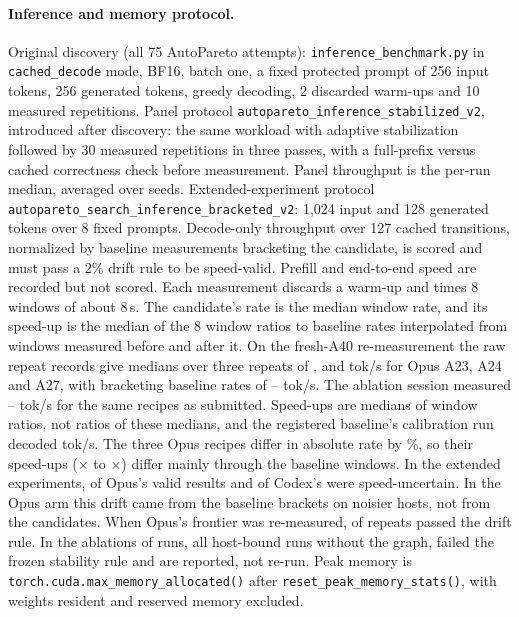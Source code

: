 \documentclass{article}
\begin{document}
\begin{table}[H]
\caption{Recorded software environment by era. Panel, Pair-A (extended experiments), E1 and Opus-test rows are read from their run records. Other rows are from the provenance audit.}\label{tab:env}
\centering\scriptsize
\end{table}

\paragraph{Inference and memory protocol.} Original discovery (all 75 AutoPareto attempts): \texttt{inference\_benchmark.py} in \texttt{cached\_decode} mode, BF16, batch one, a fixed protected prompt of 256 input tokens, 256 generated tokens, greedy decoding, 2 discarded warm-ups and 10 measured repetitions. Panel protocol \texttt{autopareto\_inference\_stabilized\_v2}, introduced after discovery: the same workload with adaptive stabilization followed by 30 measured repetitions in three passes, with a full-prefix versus cached correctness check before measurement. Panel throughput is the per-run median, averaged over seeds. Extended-experiment protocol \texttt{autopareto\_search\_inference\_bracketed\_v2}: 1,024 input and 128 generated tokens over 8 fixed prompts. Decode-only throughput over 127 cached transitions, normalized by baseline measurements bracketing the candidate, is scored and must pass a 2\% drift rule to be speed-valid. Prefill and end-to-end speed are recorded but not scored. Each measurement discards a warm-up and times 8 windows of about 8\,s. The candidate's rate is the median window rate, and its speed-up is the median of the 8 window ratios to baseline rates interpolated from windows measured before and after it. On the fresh-A40 re-measurement the raw repeat records give medians over three repeats of \CROpAbsTwentyThree, \CROpAbsTwentyFour{} and \CROpAbsTwentySeven{} tok/s for Opus A23, A24 and A27, with bracketing baseline rates of \CRPTwoBaseLo--\CRPTwoBaseHi{} tok/s. The ablation session measured \CRIAAbsLo--\CRIAAbsHi{} tok/s for the same recipes as submitted. Speed-ups are medians of window ratios, not ratios of these medians, and the registered baseline's calibration run decoded \CRAgBaseDecode{} tok/s. The three Opus recipes differ in absolute rate by \CROpAbsSpreadPct\%, so their speed-ups (\CROpDecodeLo$\times$ to \CROpDecodeHi$\times$) differ mainly through the baseline windows. In the extended experiments, \CROpUncertain{} of Opus's \CROpValid{} valid results and \CRCxUncertain{} of Codex's \CRCxValid{} were speed-uncertain. In the Opus arm this drift came from the baseline brackets on noisier hosts, not from the candidates. When Opus's frontier was re-measured, \CROpStableRepeats{} of \CROpRepeats{} repeats passed the drift rule. In the ablations \CRIAUnstable{} of \CRIARuns{} runs, all host-bound runs without the graph, failed the frozen stability rule and are reported, not re-run. Peak memory is \texttt{torch.cuda.max\_memory\_allocated()} after \texttt{reset\_peak\_memory\_stats()}, with weights resident and reserved memory excluded.
\end{document}
